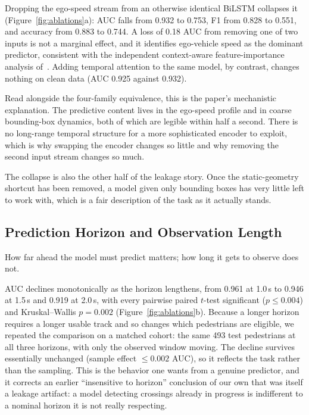 \documentclass[mti,article,submit,moreauthors]{Definitions/mdpi}
\begin{document}
Dropping the ego-speed stream from an otherwise identical BiLSTM collapses it (Figure~\ref{fig:ablations}a): AUC falls from 0.932 to 0.753, F1 from 0.828 to 0.551, and accuracy from 0.883 to 0.744. A loss of 0.18 AUC from removing one of two inputs is not a marginal effect, and it identifies ego-vehicle speed as the dominant predictor, consistent with the independent context-aware feature-importance analysis of~\citet{azarmi2024featureimportance}. Adding temporal attention to the same model, by contrast, changes nothing on clean data (AUC 0.925 against 0.932).

Read alongside the four-family equivalence, this is the paper's mechanistic explanation. The predictive content lives in the ego-speed profile and in coarse bounding-box dynamics, both of which are legible within half a second. There is no long-range temporal structure for a more sophisticated encoder to exploit, which is why swapping the encoder changes so little and why removing the second input stream changes so much.

The collapse is also the other half of the leakage story. Once the static-geometry shortcut has been removed, a model given only bounding boxes has very little left to work with, which is a fair description of the task as it actually stands.

\subsection{Prediction Horizon and Observation Length}
\label{sec:horizon}

How far ahead the model must predict matters; how long it gets to observe does not.

AUC declines monotonically as the horizon lengthens, from 0.961 at 1.0\,s to 0.946 at 1.5\,s and 0.919 at 2.0\,s, with every pairwise paired $t$-test significant ($p \le 0.004$) and Kruskal--Wallis $p = 0.002$ (Figure~\ref{fig:ablations}b). Because a longer horizon requires a longer usable track and so changes which pedestrians are eligible, we repeated the comparison on a matched cohort: the same 493 test pedestrians at all three horizons, with only the observed window moving. The decline survives essentially unchanged (sample effect $\le 0.002$ AUC), so it reflects the task rather than the sampling. This is the behavior one wants from a genuine predictor, and it corrects an earlier ``insensitive to horizon'' conclusion of our own that was itself a leakage artifact: a model detecting crossings already in progress is indifferent to a nominal horizon it is not really respecting.
\end{document}
